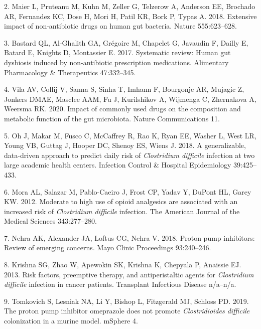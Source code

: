 \documentclass[
  11pt,
]{article}
\begin{document}
\leavevmode\hypertarget{ref-Maier2018}{}%
2. Maier L, Pruteanu M, Kuhn M, Zeller G, Telzerow A, Anderson EE,
Brochado AR, Fernandez KC, Dose H, Mori H, Patil KR, Bork P, Typas A.
2018. Extensive impact of non-antibiotic drugs on human gut bacteria.
Nature 555:623--628.

\leavevmode\hypertarget{ref-LeBastard2017}{}%
3. Bastard QL, Al-Ghalith GA, Grégoire M, Chapelet G, Javaudin F, Dailly
E, Batard E, Knights D, Montassier E. 2017. Systematic review: Human gut
dysbiosis induced by non-antibiotic prescription medications. Alimentary
Pharmacology \& Therapeutics 47:332--345.

\leavevmode\hypertarget{ref-VichVila2020}{}%
4. Vila AV, Collij V, Sanna S, Sinha T, Imhann F, Bourgonje AR, Mujagic
Z, Jonkers DMAE, Masclee AAM, Fu J, Kurilshikov A, Wijmenga C,
Zhernakova A, Weersma RK. 2020. Impact of commonly used drugs on the
composition and metabolic function of the gut microbiota. Nature
Communications 11.

\leavevmode\hypertarget{ref-Oh2018}{}%
5. Oh J, Makar M, Fusco C, McCaffrey R, Rao K, Ryan EE, Washer L, West
LR, Young VB, Guttag J, Hooper DC, Shenoy ES, Wiens J. 2018. A
generalizable, data-driven approach to predict daily risk of
\emph{Clostridium difficile} infection at two large academic health
centers. Infection Control \& Hospital Epidemiology 39:425--433.

\leavevmode\hypertarget{ref-Mora2012}{}%
6. Mora AL, Salazar M, Pablo-Caeiro J, Frost CP, Yadav Y, DuPont HL,
Garey KW. 2012. Moderate to high use of opioid analgesics are associated
with an increased risk of \emph{Clostridium difficile} infection. The
American Journal of the Medical Sciences 343:277--280.

\leavevmode\hypertarget{ref-Nehra2018}{}%
7. Nehra AK, Alexander JA, Loftus CG, Nehra V. 2018. Proton pump
inhibitors: Review of emerging concerns. Mayo Clinic Proceedings
93:240--246.

\leavevmode\hypertarget{ref-Krishna2013}{}%
8. Krishna SG, Zhao W, Apewokin SK, Krishna K, Chepyala P, Anaissie EJ.
2013. Risk factors, preemptive therapy, and antiperistaltic agents for
\emph{Clostridium difficile} infection in cancer patients. Transplant
Infectious Disease n/a--n/a.

\leavevmode\hypertarget{ref-Tomkovich2019}{}%
9. Tomkovich S, Lesniak NA, Li Y, Bishop L, Fitzgerald MJ, Schloss PD.
2019. The proton pump inhibitor omeprazole does not promote
\emph{Clostridioides difficile} colonization in a murine model. mSphere
4.
\end{document}
